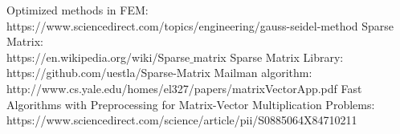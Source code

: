 \documentclass[12pt,a4paper]{article}
\begin{document}
\begin{thebibliography}{9}
 Optimized methods in FEM:\\
https://www.sciencedirect.com/topics/engineering/gauss-seidel-method
Sparse Matrix:\\
https://en.wikipedia.org/wiki/Sparse$\_$matrix
Sparse Matrix Library:\\
https://github.com/uestla/Sparse-Matrix
Mailman algorithm:\\
http://www.cs.yale.edu/homes/el327/papers/matrixVectorApp.pdf
Fast Algorithms with Preprocessing for Matrix-Vector Multiplication Problems:\\
https://www.sciencedirect.com/science/article/pii/S0885064X84710211
\end{thebibliography}
\end{document}
